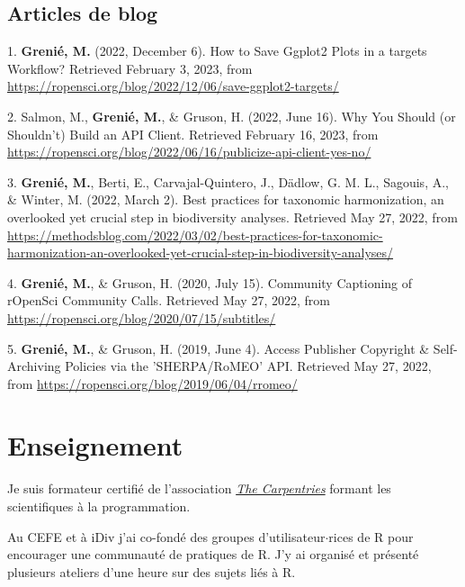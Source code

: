 \documentclass[12pt,a4paper,]{article}
\newlength{\cslhangindent}
\newenvironment{CSLReferences}[2] %
 {\begin{list}{}{%
  \setlength{\itemindent}{0pt}
  \setlength{\leftmargin}{0pt}
  \setlength{\parsep}{0pt}
  \ifodd #1
   \setlength{\leftmargin}{\cslhangindent}
   \setlength{\itemindent}{-1\cslhangindent}
  \fi
  \setlength{\itemsep}{#2\baselineskip}}}
 {\end{list}}
\begin{document}
\subsection{Articles de blog}\label{articles-de-blog}

\label{refs-e8e5b0644796f5cf65fc2be78a8ed8d4}
\begin{CSLReferences}{1}{1}
1. \textbf{Grenié, M.} (2022, December 6). How to Save Ggplot2 Plots in
a targets Workflow? Retrieved February 3, 2023, from
\url{https://ropensci.org/blog/2022/12/06/save-ggplot2-targets/}

2. Salmon, M., \textbf{Grenié, M.}, \& Gruson, H. (2022, June 16). Why
You Should (or Shouldn't) Build an API Client. Retrieved February 16,
2023, from
\url{https://ropensci.org/blog/2022/06/16/publicize-api-client-yes-no/}

3. \textbf{Grenié, M.}, Berti, E., Carvajal-Quintero, J., Dädlow, G. M.
L., Sagouis, A., \& Winter, M. (2022, March 2). Best practices for
taxonomic harmonization, an overlooked yet crucial step in biodiversity
analyses. Retrieved May 27, 2022, from
\url{https://methodsblog.com/2022/03/02/best-practices-for-taxonomic-harmonization-an-overlooked-yet-crucial-step-in-biodiversity-analyses/}

4. \textbf{Grenié, M.}, \& Gruson, H. (2020, July 15). Community
Captioning of rOpenSci Community Calls. Retrieved May 27, 2022, from
\url{https://ropensci.org/blog/2020/07/15/subtitles/}

5. \textbf{Grenié, M.}, \& Gruson, H. (2019, June 4). Access Publisher
Copyright \& Self-Archiving Policies via the 'SHERPA/RoMEO' API.
Retrieved May 27, 2022, from
\url{https://ropensci.org/blog/2019/06/04/rromeo/}

\end{CSLReferences}

\section{Enseignement}\label{enseignement}

Je suis formateur certifié de l'association
\href{https://carpentries.org/}{\emph{The Carpentries}} formant les
scientifiques à la programmation.

Au CEFE et à iDiv j'ai co-fondé des groupes d'utilisateur\(\cdotp\)rices
de R pour encourager une communauté de pratiques de R. \newline J'y ai
organisé et présenté plusieurs ateliers d'une heure sur des sujets liés
à R.
\end{document}
